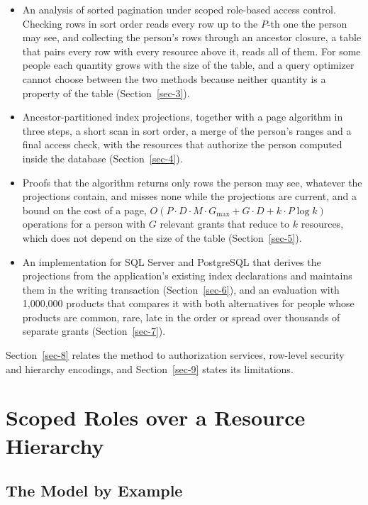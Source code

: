 \documentclass[conference]{IEEEtran}
\providecommand{\tightlist}{\setlength{\itemsep}{0pt}\setlength{\parskip}{0pt}}
\begin{document}
\begin{itemize}
\tightlist
\item
  An analysis of sorted pagination under scoped role-based access control. Checking rows in sort order reads every row up to the \(P\)-th one the person may see, and collecting the person's rows through an ancestor closure, a table that pairs every row with every resource above it, reads all of them. For some people each quantity grows with the size of the table, and a query optimizer cannot choose between the two methods because neither quantity is a property of the table (Section~\ref{sec-3}).
\item
  Ancestor-partitioned index projections, together with a page algorithm in three steps, a short scan in sort order, a merge of the person's ranges and a final access check, with the resources that authorize the person computed inside the database (Section~\ref{sec-4}).
\item
  Proofs that the algorithm returns only rows the person may see, whatever the projections contain, and misses none while the projections are current, and a bound on the cost of a page, \(O(P \cdot D \cdot M \cdot G_{\max} + G \cdot D + k \cdot P \log k)\) operations for a person with \(G\) relevant grants that reduce to \(k\) resources, which does not depend on the size of the table (Section~\ref{sec-5}).
\item
  An implementation for SQL Server and PostgreSQL that derives the projections from the application's existing index declarations and maintains them in the writing transaction (Section~\ref{sec-6}), and an evaluation with 1,000,000 products that compares it with both alternatives for people whose products are common, rare, late in the order or spread over thousands of separate grants (Section~\ref{sec-7}).
\end{itemize}

Section~\ref{sec-8} relates the method to authorization services, row-level security and hierarchy encodings, and Section~\ref{sec-9} states its limitations.

\section{Scoped Roles over a Resource Hierarchy}\label{sec-2}

\subsection{The Model by Example}\label{sec-2-1}
\end{document}
